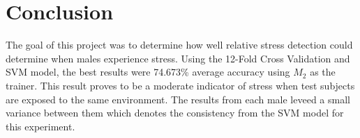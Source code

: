 \section{Conclusion}
\label{sec:conclusion}

The goal of this project was to determine how well relative stress detection could determine when males 
experience stress. Using the 12-Fold Cross Validation and SVM model, the best results were 74.673\% 
average accuracy using $M_2$ as the trainer. This result proves to be a moderate indicator of stress 
when test subjects are exposed to the same environment. The results from each male leveed a small 
variance between them which denotes the consistency from the SVM model for this experiment.  
